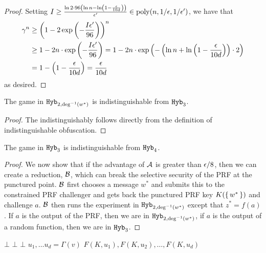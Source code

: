 \begin{lemma}
\begin{proof}
		Setting $I \geq \frac{\ln2 \cdot 96\left(\ln n - \ln \left(1 - \frac{\epsilon}{10d}\right)\right)}{\epsilon'} \in \operatorname{poly}(n, 1/\epsilon, 1/\epsilon')$, we have that
		\begin{align*}
			\gamma^n &\geq \left(1 - 2\exp\left( -\frac{I\epsilon'}{96}\right)\right)^n \\
			&\geq 1 - 2n \cdot \exp\left( -\frac{I\epsilon'}{96}\right) = 1 - 2n \cdot \exp\left( -\left(\ln n + \ln\left(1 - \frac{\epsilon}{10d}\right)\right) \cdot 2\right)\\
			&= 1 - \left(1 - \frac{\epsilon}{10d}\right) = \frac{\epsilon}{10d}
		\end{align*}
		as desired.
	\end{proof}
	
\end{lemma}

\begin{lemma}
	The game in $\texttt{Hyb}_{2, \deg^{-1}(w^*)}$ is indistinguishable from $\texttt{Hyb}_3$.
	\begin{proof}
		The indistinguishably follows directly from the definition of indistinguishable obfuscation.
	\end{proof}
\end{lemma}

\begin{lemma}
	\label{lemma:hybC}
	The game in $\texttt{Hyb}_{3}$ is indistinguishable from $\texttt{Hyb}_4$.
	\begin{proof}
		We now show that if the advantage of $\mathcal{A}$ is greater than $\epsilon/8$, then we can
		create a reduction, $\mathcal{B}$, which can break the selective security of the PRF at the punctured point.
		$\mathcal{B}$ first chooses a message $w^*$ and submits this to the constrained PRF challenger and gets back the punctured PRF key
		$K(\set{w^*})$ and challenge $a$. $\mathcal{B}$ then runs the experiment in $\texttt{Hyb}_{2, \deg^{-1}(w^*)}$
		except that $z^* = f(a)$. If $a$ is the output of the PRF, then we are in $\texttt{Hyb}_{2, \deg^{-1}(w^*)}$,
		if $a$ is the output of a random function, then we are in $\texttt{Hyb}_3$.
	\end{proof}
\end{lemma}

\begin{algorithm}[H]
	\caption{
		Circuit for the neighbor function, $\circNeigb$ with PRF key
		$K$ and constant $w^*, z^*$%
	}
	\begin{algorithmic}[1]
				\State \Return $\bot$
			\EndIf
				\State \Return $\bot$ 
			\EndIf
				\State \Return $\bot$
			\EndIf
			\State $u_1, \dots u_d = \Gamma(v)$
			\State \Return $F(K, u_1), F(K, u_2), \dots, F(K, u_d)$
		\EndFunction
	\end{algorithmic}
	\label{alg:neighbHyb1}
\end{algorithm}


